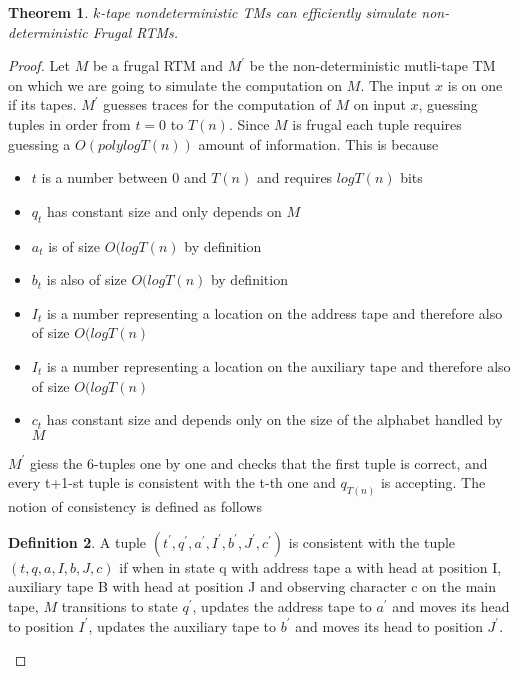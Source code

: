 \documentclass[english]{article}
\theoremstyle{plain}
\newtheorem{thm}{Theorem}
\theoremstyle{definition}
\newtheorem{defn}[thm]{Definition}
\theoremstyle{plain}
\begin{document}
\begin{thm}
  $k$-tape nondeterministic TMs can efficiently simulate
  non-deterministic Frugal RTMs.
\end{thm}

\begin{proof}
  Let $M$ be a frugal RTM and $M^{'}$ be the non-deterministic
  mutli-tape TM on which we are going to simulate the computation on
  $M$. The input $x$ is on one if its tapes. $M^{'}$ guesses traces
  for the computation of $M$ on input $x$, guessing tuples in order
  from $t = 0$ to $T(n)$. Since $M$ is frugal each tuple requires
  guessing a $O(polylog T(n))$ amount of information. This is because

  \begin{itemize}
  \item $t$ is a number between $0$ and $T(n)$ and requires $log T(n)$
    bits
  \item $q_t$ has constant size and only depends on $M$
  \item $a_t$ is of size $O(log T(n)$ by definition
  \item $b_t$ is also of size $O(log T(n)$ by definition
  \item $I_t$ is a number representing a location on the address tape
    and therefore also of size $O(log T(n)$
  \item $I_t$ is a number representing a location on the auxiliary tape
    and therefore also of size $O(log T(n)$
  \item $c_t$ has constant size and depends only on the size of the
    alphabet handled by $M$
  \end{itemize}

  $M^{'}$ giess the 6-tuples one by one and checks that the first tuple
  is correct, and every t+1-st tuple is consistent with the t-th one and
  $q_{T(n)}$ is accepting. The notion of consistency is defined as
  follows

  \begin{defn}
    A tuple $(t^{'}, q^{'}, a^{'}, I^{'}, b^{'}, J^{'}, c^{'})$ is
    consistent with the tuple $(t, q, a, I, b, J, c)$ if when in state q
    with address tape a with head at position I, auxiliary tape B with
    head at position J and observing character c on the main tape, $M$
    transitions to state $q^{'}$, updates the address tape to $a^{'}$
    and moves its head to position $I^{'}$, updates the auxiliary tape
    to $b^{'}$ and moves its head to position $J^{'}$.
  \end{defn}


\end{proof}
\end{document}
